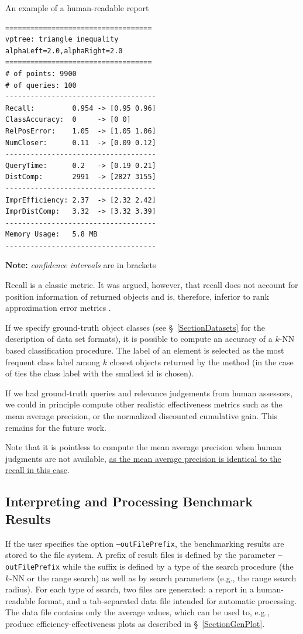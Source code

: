 \documentclass[runningheads,a4paper]{llncs}
\newcommand{\ttt}[1]{\texttt{#1}}
\newcommand{\knn}{$k$-NN }
\begin{document}
{\begin{table}
\caption{An example of a human-readable report 
\label{TableHRep}}
\begin{verbatim}
===================================
vptree: triangle inequality
alphaLeft=2.0,alphaRight=2.0
===================================
# of points: 9900
# of queries: 100
------------------------------------
Recall:         0.954 -> [0.95 0.96]
ClassAccuracy:  0     -> [0 0]
RelPosError:    1.05  -> [1.05 1.06]
NumCloser:      0.11  -> [0.09 0.12]
------------------------------------
QueryTime:      0.2   -> [0.19 0.21]
DistComp:       2991  -> [2827 3155]
------------------------------------
ImprEfficiency: 2.37  -> [2.32 2.42]
ImprDistComp:   3.32  -> [3.32 3.39]
------------------------------------
Memory Usage:   5.8 MB
------------------------------------
\end{verbatim}
\textbf{Note:} \emph{confidence intervals} are in brackets
\end{table}


Recall is a classic metric. 
It was argued, however, 
that recall does not account for position information of returned objects
and is, therefore, inferior to rank approximation error metrics \cite{Amato_et_al:2003,Cayton2008}.

If we specify ground-truth object classes (see \S~\ref{SectionDatasets} 
for the description of data set formats), 
it is possible to compute an accuracy of a \knn based classification procedure.
The label of an element is selected as the most frequent class label among $k$ closest objects
returned by the method (in the case of ties the class label with the smallest id is chosen).

If we had ground-truth queries and relevance judgements from human assessors,
we could in principle compute other realistic effectiveness metrics 
such as the mean average precision,
or the normalized discounted cumulative gain.
This remains for the future work.

Note that it is pointless to compute the mean average precision
when human judgments are not available, \href{http://searchivarius.org/blog/when-average-precision-equal-recall}{as the mean average precision
is identical to the recall in this case}.

\subsection{Interpreting and Processing Benchmark Results}
If the user specifies the option \ttt{--outFilePrefix},
the benchmarking results are stored to the file system.
A prefix of result files is defined by the parameter \ttt{--outFilePrefix}
while the suffix is defined by a type of the search procedure (the \knn or the range search)
as well as by search parameters (e.g., the range search radius).
For each type of search, two files are generated:
a report in a human-readable format,
and a tab-separated data file intended for automatic processing.
The data file contains only the average values,
which can be used to, e.g., produce efficiency-effectiveness plots
as described in \S~\ref{SectionGenPlot}.

}
\end{document}
